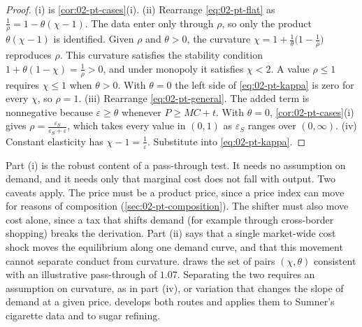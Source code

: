\begin{proof}
(i) is \cref{cor:02-pt-cases}(i). (ii) Rearrange \eqref{eq:02-pt-flat} as $\frac{1}{\rho} = 1 - \theta(\chi - 1)$.
The data enter only through $\rho$, so only the product $\theta(\chi - 1)$ is identified. Given $\rho$ and
$\theta > 0$, the curvature $\chi = 1 + \frac{1}{\theta}\bigl(1 - \frac{1}{\rho}\bigr)$ reproduces $\rho$. This
curvature satisfies the stability condition $1 + \theta(1 - \chi) = \frac{1}{\rho} > 0$, and under monopoly it
satisfies $\chi < 2$. A value $\rho \le 1$ requires $\chi \le 1$ when $\theta > 0$. With $\theta = 0$ the left
side of \eqref{eq:02-pt-kappa} is zero for every $\chi$, so $\rho = 1$. (iii) Rearrange \eqref{eq:02-pt-general}.
The added term is nonnegative because $\varepsilon \ge \theta$ whenever $P \ge MC + t$. With $\theta = 0$,
\cref{cor:02-pt-cases}(i) gives $\rho = \frac{\varepsilon_S}{\varepsilon_S + \varepsilon}$, which takes every
value in $(0, 1)$ as $\varepsilon_S$ ranges over $(0, \infty)$. (iv) Constant elasticity has $\chi - 1 = \frac{1}{\varepsilon}$.
Substitute into \eqref{eq:02-pt-kappa}.
\end{proof}

Part (i) is the robust content of a pass-through test. It needs no assumption on demand, and it needs only that
marginal cost does not fall with output. Two caveats apply. The price must be a product price, since a price
index can move for reasons of composition (\cref{sec:02-pt-composition}). The shifter must also move cost alone,
since a tax that shifts demand (for example through cross-border shopping) breaks the derivation. Part (ii) says
that a single market-wide cost shock moves the equilibrium along one demand curve, and that this movement cannot
separate conduct from curvature.  draws the set of pairs $(\chi, \theta)$ consistent
with an illustrative pass-through of $1.07$. Separating the two requires an assumption on curvature, as in part
(iv), or variation that changes the slope of demand at a given price.  develops both routes and
applies them to Sumner's cigarette data and to sugar refining.

